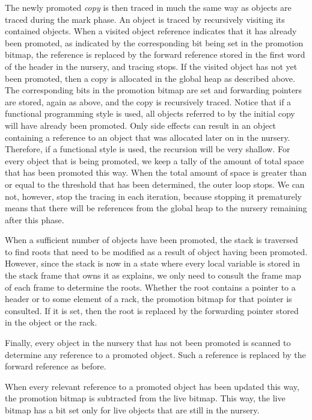 The newly promoted \emph{copy} is then traced in much the same way as
objects are traced during the mark phase.  An object is traced by
recursively visiting its contained objects.  When a visited object
reference indicates that it has already been promoted, as indicated by
the corresponding bit being set in the promotion bitmap, the reference
is replaced by the forward reference stored in the first word of the
header in the nursery, and tracing stops.  If the visited object has
not yet been promoted, then a copy is allocated in the global heap as
described above.  The corresponding bits in the promotion bitmap are set
and forwarding pointers are stored, again as above, and the copy is
recursively traced.  Notice that if a functional programming style is
used, all objects referred to by the initial copy will have already
been promoted.  Only side effects can result in an object containing a
reference to an object that was allocated later on in the nursery.
Therefore, if a functional style is used, the recursion will be very
shallow.  For every object that is being promoted, we keep a tally of
the amount of total space that has been promoted this way.  When the
total amount of space is greater than or equal to the threshold that
has been determined, the outer loop stops.  We can not, however, stop
the tracing in each iteration, because stopping it prematurely means
that there will be references from the global heap to the nursery
remaining after this phase.

When a sufficient number of objects have been promoted, the stack is
traversed to find roots that need to be modified as a result of object
having been promoted.  However, since the stack is now in a state
where every local variable is stored in the stack frame that owns it
as  explains, we only
need to consult the frame map of each frame to determine the roots.
Whether the root contains a pointer to a header or to some element of
a rack, the promotion bitmap for that pointer is consulted.  If it
is set, then the root is replaced by the forwarding pointer stored in
the object or the rack.

Finally, every object in the nursery that has not been promoted is
scanned to determine any reference to a promoted object.  Such a
reference is replaced by the forward reference as before.

When every relevant reference to a promoted object has been updated
this way, the promotion bitmap is subtracted from the live
bitmap.  This way, the live bitmap has a bit set only for live
objects that are still in the nursery.

